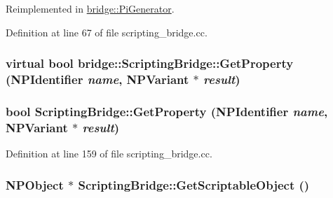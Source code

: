 Reimplemented in \hyperlink{classbridge_1_1_pi_generator_aa5be4efa2d7fe286582ccec734619db4}{bridge::PiGenerator}.



Definition at line 67 of file scripting\_\-bridge.cc.

\hypertarget{classbridge_1_1_scripting_bridge_aa7f5844674672f5872137ffee032427e}{
\subsubsection[{GetProperty}]{\setlength{\rightskip}{0pt plus 5cm}virtual bool bridge::ScriptingBridge::GetProperty (NPIdentifier {\em name}, \/  NPVariant $\ast$ {\em result})}}
\label{classbridge_1_1_scripting_bridge_aa7f5844674672f5872137ffee032427e}
\hypertarget{classbridge_1_1_scripting_bridge_afef889fc2ff5ccabefb713cf7ad5e056}{
\subsubsection[{GetProperty}]{\setlength{\rightskip}{0pt plus 5cm}bool ScriptingBridge::GetProperty (NPIdentifier {\em name}, \/  NPVariant $\ast$ {\em result})}}
\label{classbridge_1_1_scripting_bridge_afef889fc2ff5ccabefb713cf7ad5e056}


Definition at line 159 of file scripting\_\-bridge.cc.

\hypertarget{classbridge_1_1_scripting_bridge_aab70aec1714cf92f28dca4afb87ad3b4}{
\subsubsection[{GetScriptableObject}]{\setlength{\rightskip}{0pt plus 5cm}NPObject $\ast$ ScriptingBridge::GetScriptableObject ()}}
\label{classbridge_1_1_scripting_bridge_aab70aec1714cf92f28dca4afb87ad3b4}


